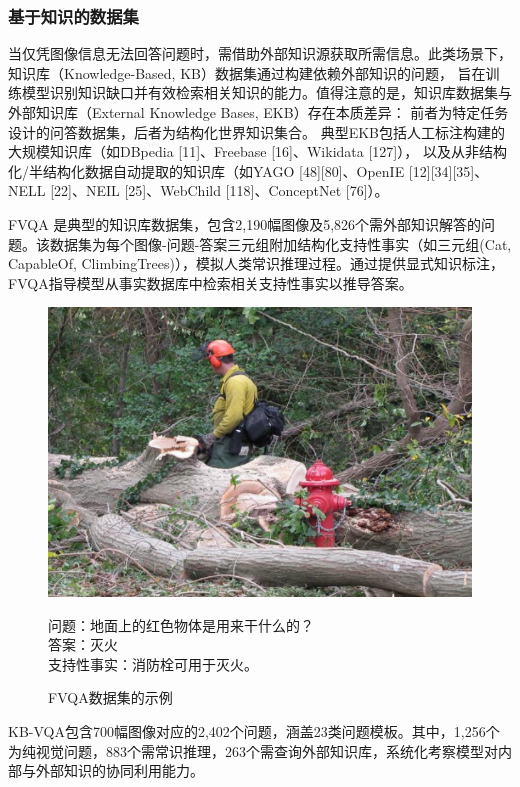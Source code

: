 \subsubsection{基于知识的数据集}
当仅凭图像信息无法回答问题时，需借助外部知识源获取所需信息。此类场景下，知识库（Knowledge-Based, KB）数据集通过构建依赖外部知识的问题，
旨在训练模型识别知识缺口并有效检索相关知识的能力。值得注意的是，知识库数据集与外部知识库（External Knowledge Bases, EKB）存在本质差异：
前者为特定任务设计的问答数据集，后者为结构化世界知识集合。
典型EKB包括人工标注构建的大规模知识库（如DBpedia [11]、Freebase [16]、Wikidata [127]），
以及从非结构化/半结构化数据自动提取的知识库（如YAGO [48][80]、OpenIE [12][34][35]、NELL [22]、NEIL [25]、WebChild [118]、ConceptNet [76]）。

FVQA\cite{wang2017fvqa} 是典型的知识库数据集，包含2,190幅图像及5,826个需外部知识解答的问题。该数据集为每个图像-问题-答案三元组附加结构化支持性事实（如三元组(Cat, CapableOf, ClimbingTrees)），模拟人类常识推理过程。通过提供显式知识标注，FVQA指导模型从事实数据库中检索相关支持性事实以推导答案。
\begin{figure}
    \centering
    \includegraphics[scale=0.38]{figures/FTVQA.png}
    \begin{center}
        \footnotesize 问题：地面上的红色物体是用来干什么的？\\
        \footnotesize 答案：灭火\\
        \footnotesize 支持性事实：消防栓可用于灭火。
    \end{center}
    \caption{FVQA数据集的示例}
    \label{fig:fvqa-example}
\end{figure}
KB-VQA\cite{wang2015explicit}包含700幅图像对应的2,402个问题，涵盖23类问题模板。其中，1,256个为纯视觉问题，883个需常识推理，263个需查询外部知识库，系统化考察模型对内部与外部知识的协同利用能力。

